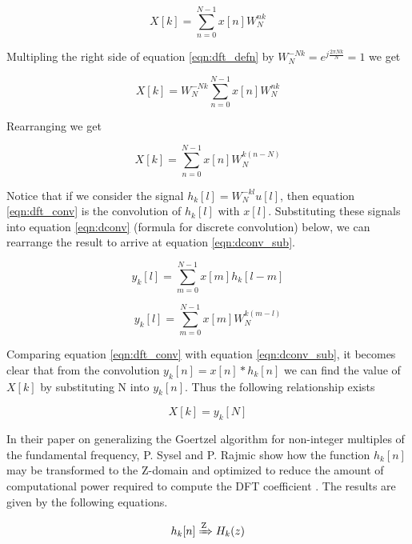 \begin{equation}
\label{eqn:dft_defn}
X[k] = \sum_{n=0}^{N-1}x[n]W_{N}^{nk}
\end{equation}

Multipling the right side of equation \ref{eqn:dft_defn} by \(W_{N}^{-Nk} = e^{j\frac{2\pi N k}{N}} = 1\) we get

\begin{equation}
X[k] = W_{N}^{-Nk}\sum_{n=0}^{N-1}x[n]W_{N}^{nk}
\end{equation}

Rearranging we get

\begin{equation}
\label{eqn:dft_conv}
X[k] = \sum_{n=0}^{N-1}x[n]W_{N}^{k(n-N)}
\end{equation}

Notice that if we consider the signal \(h_k[l] = W_N^{-kl}u[l]\), then equation \ref{eqn:dft_conv} is the convolution of $h_k[l]$ with $x[l]$. Substituting these signals into equation \ref{eqn:dconv} (formula for discrete convolution) below, we can rearrange the result to arrive at equation \ref{eqn:dconv_sub}.

\begin{equation}
\label{eqn:dconv}
y_k[l] = \sum_{m=0}^{N-1}x[m]h_k[l - m]
\end{equation}

\begin{equation}
\label{eqn:dconv_sub}
y_k[l] = \sum_{m=0}^{N-1}x[m]W_N^{k(m-l)}
\end{equation}

Comparing equation \ref{eqn:dft_conv} with equation \ref{eqn:dconv_sub}, it becomes clear that from the convolution $y_k[n] = x[n] * h_k[n]$ we can find the value of $X[k]$ by substituting N into $y_k[n]$. Thus the following relationship exists

\begin{equation}
\label{eqn:goertzel_relationship}
X[k] = y_k[N]
\end{equation}


In their paper on generalizing the Goertzel algorithm for non-integer multiples of the fundamental frequency, P. Sysel and P. Rajmic show how the function $h_k[n]$ may be transformed to the Z-domain and optimized to reduce the amount of computational power required to compute the DFT coefficient \cite{Sysel2012}. The results are given by the following equations.

\[h_k[n] \xRightarrow{\text{Z}} H_k(z)\]

